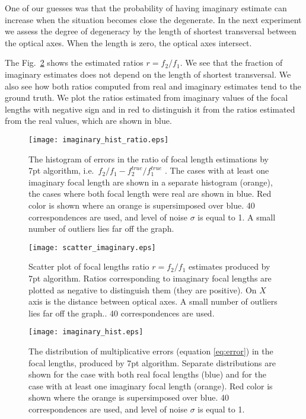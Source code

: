  One of our guesses was that the probability of having imaginary estimate can increase when the situation becomes close the degenerate. In the next experiment we assess the degree of degeneracy by the length of shortest transversal between the optical axes. When the length is zero, the optical axes intersect. 

The Fig.~\ref{scatter_imaginary} shows the estimated ratios $r=f_2\slash f_1$. We see that the fraction of imaginary estimates does not depend on the length of shortest transversal. We also see how both ratios computed from real and imaginary estimates tend to the ground truth. We plot the ratios estimated from imaginary values of the focal lengths with negative sign and in red to distinguish it from the ratios estimated from the real values, which are shown in blue.


\begin{figure}[h!]
  \begin{center}
    \texttt{[image: imaginary\_hist\_ratio.eps]}
    \caption[Histogram of errors in the ratio of the focal length]{The histogram of errors in the ratio of focal length estimations by 7pt algorithm, i.e.\  $f_2 \slash f_1 - f_2^{true} \slash f_1^{true}$ . The cases with at least one imaginary focal length are shown in a separate histogram (orange), the cases where both focal length were real are shown in blue.  Red color is shown where an orange is supersimposed over blue. 40 correspondences are used, and level of noise $\sigma$ is equal to 1. A small number of outliers lies far off the graph.}
    \label{imagist_ratio}
  \end{center}
\end{figure}


\begin{figure}[h!]
  \begin{center}
    \texttt{[image: scatter\_imaginary.eps]}
    \caption[Scattered focal length ratio estimates]{Scatter plot of focal lengths ratio $r=f_2\slash f_1$ estimates produced by 7pt algorithm. Ratios corresponding to imaginary focal lengths are plotted as negative to distinguish them (they are positive). On $X$ axis is the distance between optical axes.  A small number of outliers lies far off the graph.. 40 correspondences are used. }
    \label{scatter_imaginary}
  \end{center}
\end{figure}

\begin{figure}[h!]
  \begin{center}
    \texttt{[image: imaginary\_hist.eps]}
    \caption[Histogram of errors in the focal length]{The distribution of multiplicative errors (equation \ref{eq:error}) in the focal lengths, produced by 7pt algorithm. Separate distributions are shown for the  case with both real focal lengths (blue) and for the case with at least one imaginary focal length (orange). Red color is shown where the orange is supersimposed over blue. 40 correspondences are used, and level of noise $\sigma$ is equal to 1. }
    \label{imagist}
  \end{center}
\end{figure}


